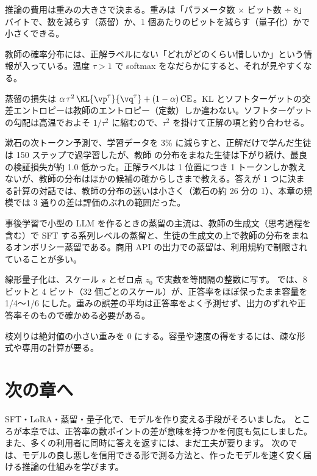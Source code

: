 \begin{summary}
\item 推論の費用は重みの大きさで決まる。重みは「パラメータ数 × ビット数 ÷ 8」バイトで、数を減らす（蒸留）か、1 個あたりのビットを減らす（量子化）かで小さくできる。
\item 教師の確率分布には、正解ラベルにない「どれがどのくらい惜しいか」という情報が入っている。温度 $\tau>1$ で softmax をなだらかにすると、それが見やすくなる。
\item 蒸留の損失は $\alpha\,\tau^2\,\KL{\vp^\tau}{\vq^\tau}+(1-\alpha)\,\mathrm{CE}$。KL とソフトターゲットの交差エントロピーは教師のエントロピー（定数）しか違わない。ソフトターゲットの勾配は高温でおよそ $1/\tau^2$ に縮むので、$\tau^2$ を掛けて正解の項と釣り合わせる。
\item 漱石の次トークン予測で、学習データを 3\% に減らすと、正解だけで学んだ生徒は 150 ステップで過学習したが、教師  の分布をまねた生徒は下がり続け、最良の検証損失が約 1.0 低かった。正解ラベルは 1 位置につき 1 トークンしか教えないが、教師の分布はほかの候補の確からしさまで教える。答えが 1 つに決まる計算の対話では、教師の分布の迷いは小さく（漱石の約 26 分の 1）、本章の規模では 3 通りの差は評価のぶれの範囲だった。
\item 事後学習で小型の LLM を作るときの蒸留の主流は、教師の生成文（思考過程を含む）で SFT する系列レベルの蒸留と、生徒の生成文の上で教師の分布をまねるオンポリシー蒸留である。商用 API の出力での蒸留は、利用規約で制限されていることが多い。
\item 線形量子化は、スケール $s$ とゼロ点 $z_0$ で実数を等間隔の整数に写す。 では、8 ビットと 4 ビット（32 個ごとのスケール）が、正答率をほぼ保ったまま容量を 1/4〜1/6 にした。重みの誤差の平均は正答率をよく予測せず、出力のずれや正答率そのもので確かめる必要がある。
\item 枝刈りは絶対値の小さい重みを 0 にする。容量や速度の得をするには、疎な形式や専用の計算が要る。
\end{summary}

\section*{次の章へ}

SFT・LoRA・蒸留・量子化で、モデルを作り変える手段がそろいました。
ところが本章では、正答率の数ポイントの差が意味を持つかを何度も気にしました。また、多くの利用者に同時に答えを返すには、まだ工夫が要ります。
次のでは、モデルの良し悪しを信用できる形で測る方法と、作ったモデルを速く安く届ける推論の仕組みを学びます。

